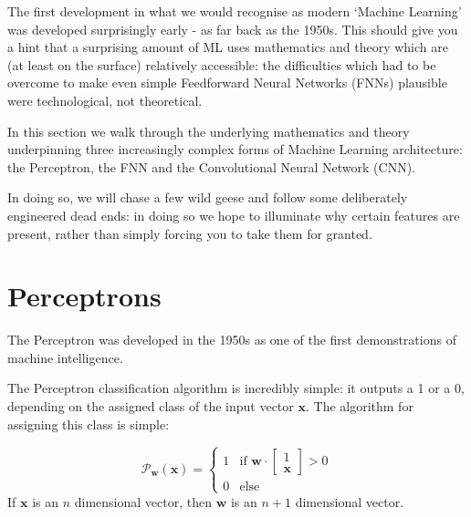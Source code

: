 \documentclass[a4paper,openany,11pt]{book}
\renewcommand\vec[1]{\boldsymbol{\mathbf{#1}}}
\begin{document}


			The first development in what we would recognise as modern `Machine Learning' was developed surprisingly early - as far back as the 1950s. This should give you a hint that a surprising amount of ML uses mathematics and theory which are (at least on the surface) relatively accessible: the difficulties which had to be overcome to make even simple Feedforward Neural Networks (FNNs) plausible were technological, not theoretical.

			In this section we walk through the underlying mathematics and theory underpinning three increasingly complex forms of Machine Learning architecture: the Perceptron, the FNN and the Convolutional Neural Network (CNN). 
			
			In doing so, we will chase a few wild geese and follow some deliberately engineered dead ends: in doing so we hope to illuminate why certain features are present, rather than simply forcing you to take them for granted. 

		\chapter{Perceptrons}

			The Perceptron was developed in the 1950s as one of the first demonstrations of machine intelligence. 
			
			The Perceptron classification algorithm is incredibly simple: it outputs a 1 or a 0, depending on the assigned class of the input vector $\vec{x}$. The algorithm for assigning this class is simple:

			\begin{equation}
				\mathcal{P}_{\vec{w}}(\vec{x}) = \begin{cases} 1 & \text{if } \vec{w} \cdot \begin{bmatrix}
					1 \\ \vec{x}
				\end{bmatrix} > 0 \\ 0 & \text{else} \end{cases}
			\end{equation}
			If $\vec{x}$ is an $n$ dimensional vector, then $\vec{w}$ is an $n+1$ dimensional vector. 
\end{document}
